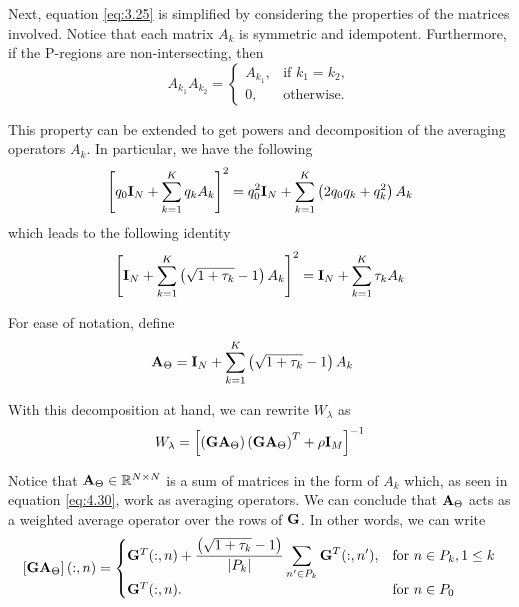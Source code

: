 
Next, equation \eqref{eq:3.25} is simplified by considering the properties of the matrices involved.
%
Notice that each matrix $A_k$ is symmetric and idempotent.
%
Furthermore, if the P-regions are non-intersecting, then
\begin{equation}
    A_{k_1} A_{k_2} = 
    \begin{cases}
        A_{k_1}, &\text{if } k_1=k_2, \\
        0, &\text{otherwise.}
    \end{cases}
    \label{eq:3.27}
\end{equation}

This property can be extended to get powers and decomposition of the averaging operators $A_k$.
%
In particular, we have the following
\begin{equation}
    \left[ q_0 \mathbf{I}_N + \sum_{k=1}^K q_k A_k \right]^2
    =
    q_0^2 \mathbf{I}_N + \sum_{k=1}^K \left( 2q_0 q_k + q_k^2 \right) A_k
\end{equation}
which leads to the following identity
\begin{equation}
    \left[ \mathbf{I}_N + \sum_{k=1}^K \left( \sqrt{1+\tau_k}-1 \right) A_k \right]^2
    =
    \mathbf{I}_N + \sum_{k=1}^K {\tau_k} A_k
\end{equation}

For ease of notation, define
\begin{align}
    \mathbf{A}_{\Theta} &=
    \mathbf{I}_N + \sum_{k=1}^K \left( \sqrt{1+\tau_k}-1 \right) A_k
\end{align}

With this decomposition at hand, we can rewrite $W_\lambda$ as
\begin{equation}
    W_\lambda =
    \left[  \left( \mathbf{G} \mathbf{A}_{{\Theta}} \right) \left( \mathbf{G} \mathbf{A}_{{\Theta}} \right)^T
    + \rho \mathbf{I}_M  \right]^{-1}
\end{equation}

Notice that $\mathbf{A}_\Theta\in \mathbb{R}^{N\times N}$ is a sum of matrices in the form of $A_k$ which, as seen in equation \eqref{eq:4.30}, 
work as averaging operators.
%
We can conclude that $\mathbf{A}_\Theta$ acts as a weighted average operator over the rows of $\mathbf{G}$. In other words, we can write
\begin{equation}
    \left[ \mathbf{G} \mathbf{A}_\Theta \right](:, n) =
    \begin{cases}
    \mathbf{G}^T(:,n) 
    +  \displaystyle\frac{\left( \sqrt{1+\tau_k}-1 \right)}{\left| {P_k} \right|} \sum_{n' \in P_k} \mathbf{G}^T(:, n'), &\text{for } n\in P_k, 1\leq k \\
    \mathbf{G}^T(:,n).
    &\text{for } n\in P_0
    \end{cases}
\end{equation}

